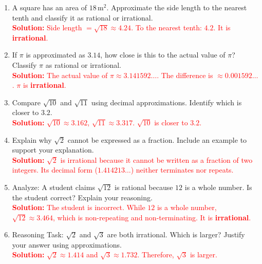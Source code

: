 \documentclass[10pt]{article}
\begin{document}
\begin{tcolorbox}[colframe=black!60, colback=white, 
coltitle=black, colbacktitle=black!15, fonttitle=\bfseries\Large, 
title=Problems, halign title=center, left=10pt, right=10pt, top=10pt, bottom=60pt]
\begin{enumerate}[start=8, itemsep=1em]
    \item A square has an area of \( 18 \, \text{m}^2 \). Approximate the side length to the nearest tenth and classify it as rational or irrational.\\
    \textcolor{red}{\textbf{Solution:} Side length \(= \sqrt{18} \approx 4.24\). To the nearest tenth: \(4.2\). It is \textbf{irrational}.}

    \item If \( \pi \) is approximated as \( 3.14 \), how close is this to the actual value of \( \pi \)? Classify \( \pi \) as rational or irrational.\\
    \textcolor{red}{\textbf{Solution:} The actual value of \( \pi \approx 3.141592\ldots \). The difference is \( \approx 0.001592\ldots \). \( \pi \) is \textbf{irrational}.}

    \item Compare \( \sqrt{10} \) and \( \sqrt{11} \) using decimal approximations. Identify which is closer to \( 3.2 \).\\
    \textcolor{red}{\textbf{Solution:} \( \sqrt{10} \approx 3.162 \), \( \sqrt{11} \approx 3.317 \). \( \sqrt{10} \) is closer to \(3.2\).}

    \item Explain why \( \sqrt{2} \) cannot be expressed as a fraction. Include an example to support your explanation.\\
    \textcolor{red}{\textbf{Solution:} \( \sqrt{2} \) is irrational because it cannot be written as a fraction of two integers. Its decimal form (\(1.414213...\)) neither terminates nor repeats.}

    \item Analyze: A student claims \( \sqrt{12} \) is rational because \( 12 \) is a whole number. Is the student correct? Explain your reasoning.\\
    \textcolor{red}{\textbf{Solution:} The student is incorrect. While \(12\) is a whole number, \( \sqrt{12} \approx 3.464 \), which is non-repeating and non-terminating. It is \textbf{irrational}.}

    \item Reasoning Task: \( \sqrt{2} \) and \( \sqrt{3} \) are both irrational. Which is larger? Justify your answer using approximations.\\
    \textcolor{red}{\textbf{Solution:} \( \sqrt{2} \approx 1.414 \) and \( \sqrt{3} \approx 1.732 \). Therefore, \( \sqrt{3} \) is larger.}


\end{enumerate}
\end{tcolorbox}
\end{document}
